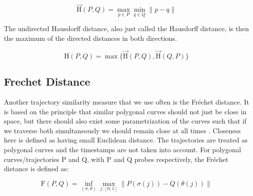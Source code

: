 \documentclass[twoside,12pt, a4paper]{report}
\begin{document}
$$\overrightarrow{\mathrm{H}}(P, Q)=\max _{p \in P} \min _{q \in Q} \| p-q \| $$

The undirected Hausdorff distance, also just called the Hausdorff distance, is then
the maximum of the directed distances in both directions.

$$\mathrm{H}(P, Q)=\max \{\overrightarrow{\mathrm{H}}(P, Q), \overrightarrow{\mathrm{H}}(Q, P)\} $$


\subsection{Frechet Distance}

 
Another trajectory similarity measure that we use often is the Fréchet distance. It
is based on the principle that similar polygonal curves should not just be close in
space, but there should also exist some parametrization of the curves such that if
we traverse both simultaneously we should remain close at all times \cite{kerkhof2022algorithmic}. Closeness
here is defined as having small Euclidean distance. The trajectories are treated as
polygonal curves and the timestamps are not taken into account. For polygonal
curves/trajectories P and Q, with P and Q probes respectively, the Fréchet distance
is defined as:

$$\mathrm{F}(P, Q)=\inf _{(\sigma, \theta)} \max _{j:[0,1]}\|P(\sigma(j))-Q(\theta(j))\| $$
\end{document}
